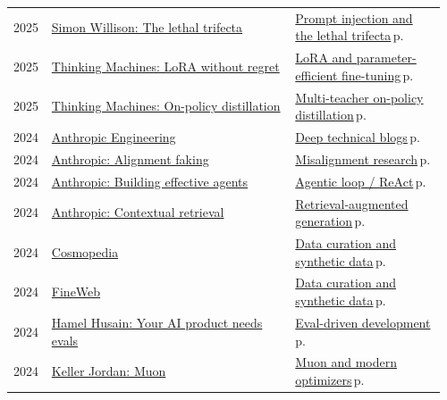 \documentclass[10pt,a4paper,openany]{report}
\begin{document}
{\begin{longtable}{@{}p{0.07\linewidth}>{\raggedright}p{0.55\linewidth}>{\raggedright\arraybackslash}p{0.34\linewidth}@{}}
2025 & \href{https://simonwillison.net/2025/Jun/16/the-lethal-trifecta/}{Simon Willison: The lethal trifecta} & \hyperref[c:safety-3]{Prompt injection and the lethal trifecta}\,{\color{muted}\scriptsize p.\,\pageref{c:safety-3}}\\
2025 & \href{https://thinkingmachines.ai/blog/lora/}{Thinking Machines: LoRA without regret} & \hyperref[c:training-5]{LoRA and parameter-efficient fine-tuning}\,{\color{muted}\scriptsize p.\,\pageref{c:training-5}}\\
2025 & \href{https://thinkingmachines.ai/blog/on-policy-distillation/}{Thinking Machines: On-policy distillation} & \hyperref[c:reasoning-3]{Multi-teacher on-policy distillation}\,{\color{muted}\scriptsize p.\,\pageref{c:reasoning-3}}\\
2024 & \href{https://www.anthropic.com/engineering}{Anthropic Engineering} & \hyperref[c:learn-0]{Deep technical blogs}\,{\color{muted}\scriptsize p.\,\pageref{c:learn-0}}\\
2024 & \href{https://www.anthropic.com/research/alignment-faking}{Anthropic: Alignment faking} & \hyperref[c:safety-9]{Misalignment research}\,{\color{muted}\scriptsize p.\,\pageref{c:safety-9}}\\
2024 & \href{https://www.anthropic.com/engineering/building-effective-agents}{Anthropic: Building effective agents} & \hyperref[c:agents-3]{Agentic loop / ReAct}\,{\color{muted}\scriptsize p.\,\pageref{c:agents-3}}\\
2024 & \href{https://www.anthropic.com/news/contextual-retrieval}{Anthropic: Contextual retrieval} & \hyperref[c:context-5]{Retrieval-augmented generation}\,{\color{muted}\scriptsize p.\,\pageref{c:context-5}}\\
2024 & \href{https://huggingface.co/blog/cosmopedia}{Cosmopedia} & \hyperref[c:training-3]{Data curation and synthetic data}\,{\color{muted}\scriptsize p.\,\pageref{c:training-3}}\\
2024 & \href{https://huggingface.co/spaces/HuggingFaceFW/blogpost-fineweb-v1}{FineWeb} & \hyperref[c:training-3]{Data curation and synthetic data}\,{\color{muted}\scriptsize p.\,\pageref{c:training-3}}\\
2024 & \href{https://hamel.dev/blog/posts/evals/}{Hamel Husain: Your AI product needs evals} & \hyperref[c:practice-4]{Eval-driven development}\,{\color{muted}\scriptsize p.\,\pageref{c:practice-4}}\\
2024 & \href{https://kellerjordan.github.io/posts/muon/}{Keller Jordan: Muon} & \hyperref[c:training-2]{Muon and modern optimizers}\,{\color{muted}\scriptsize p.\,\pageref{c:training-2}}\\

\end{longtable}}
\end{document}
